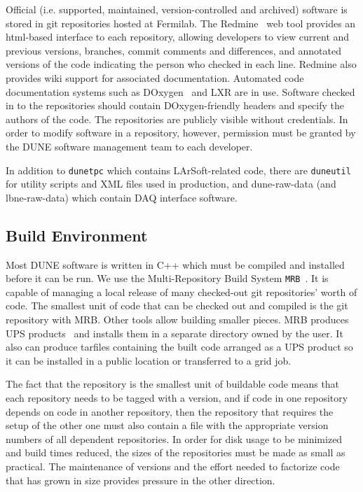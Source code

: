 Official (i.e. supported, maintained, version-controlled and archived) software is stored in git repositories
hosted at Fermilab.  The Redmine~\cite{ref:redmine,ref:redmine2} 
web tool provides an html-based interface to each repository,
allowing developers to view current and previous versions, branches, commit comments and differences, and
annotated versions of the code indicating the person who checked in each line.  Redmine also provides wiki
support for associated documentation.  Automated code documentation systems such as DOxygen~\cite{ref:doxygen}
and LXR are in use.  Software checked in to the repositories should contain DOxygen-friendly headers and
specify the authors of the code.  The repositories are publicly visible without credentials.  In order to
modify software in a repository, however, permission must be granted by the DUNE software management team
to each developer.

In addition to {\tt dunetpc} which contains LArSoft-related code, there are {\tt duneutil} for utility scripts
and XML files used in production, and dune-raw-data (and lbne-raw-data) which contain DAQ interface software.

\subsection{Build Environment}

Most DUNE software is written in C++ which must be compiled and installed before it can be run.  We use the
Multi-Repository Build System {\tt MRB}~\cite{ref:mrb}.  It is capable of managing a local release of many checked-out
git repositories' worth of code.  The smallest unit of code that can be checked out and compiled is the git
repository with MRB.  Other tools allow building smaller pieces.  MRB produces UPS products~\cite{ref:ups} 
and installs them in a separate directory owned by the user.  It also can produce tarfiles containing
the built code arranged as a UPS product so it can be installed in a public location or transferred to a grid job.

The fact that the repository is the smallest unit of buildable code means that each repository needs to be
tagged with a version, and if code in one repository depends on code in another repository, then the
repository that requires the setup of the other one must also contain a file with the appropriate version numbers
of all dependent repositories.  In order for disk usage to be minimized and build times reduced, the sizes 
of the repositories must be made as small as practical.  The maintenance of versions and the effort
needed to factorize code that has grown in size provides pressure in the other direction.

